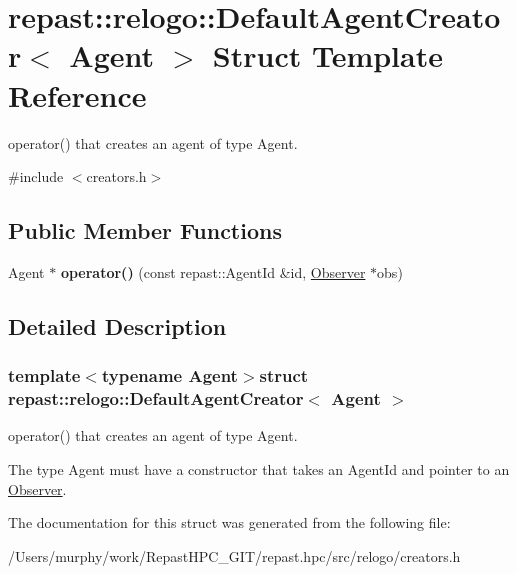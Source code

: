 \hypertarget{structrepast_1_1relogo_1_1_default_agent_creator}{\section{repast\-:\-:relogo\-:\-:Default\-Agent\-Creator$<$ Agent $>$ Struct Template Reference}
\label{structrepast_1_1relogo_1_1_default_agent_creator}
}


operator() that creates an agent of type Agent.  




{\ttfamily \#include $<$creators.\-h$>$}

\subsection*{Public Member Functions}
\begin{DoxyCompactItemize}
\item 
\hypertarget{structrepast_1_1relogo_1_1_default_agent_creator_a56e7418784408bb366790b8ca7363e3a}{Agent $\ast$ {\bfseries operator()} (const repast\-::\-Agent\-Id \&id, \hyperlink{classrepast_1_1relogo_1_1_observer}{Observer} $\ast$obs)}\label{structrepast_1_1relogo_1_1_default_agent_creator_a56e7418784408bb366790b8ca7363e3a}

\end{DoxyCompactItemize}


\subsection{Detailed Description}
\subsubsection*{template$<$typename Agent$>$struct repast\-::relogo\-::\-Default\-Agent\-Creator$<$ Agent $>$}

operator() that creates an agent of type Agent. 

The type Agent must have a constructor that takes an Agent\-Id and pointer to an \hyperlink{classrepast_1_1relogo_1_1_observer}{Observer}. 

The documentation for this struct was generated from the following file\-:\begin{DoxyCompactItemize}
\item 
/\-Users/murphy/work/\-Repast\-H\-P\-C\-\_\-\-G\-I\-T/repast.\-hpc/src/relogo/creators.\-h\end{DoxyCompactItemize}
